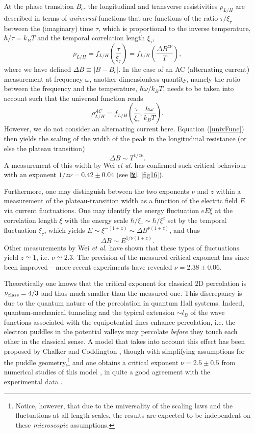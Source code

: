\documentclass[10pt]{book}
\newcommand{\beq}{\begin{equation}}
\newcommand{\eeq}{\end{equation}}
\begin{document}
At the phase transition $B_c$, the longitudinal and transverse resistivities $\rho_{L/H}$ are described in terms of
{\sl universal} functions that are functions of the ratio $\tau/\xi_{\tau}$ between the (imaginary) time $\tau$,
which is proportional to the inverse temperature, $\hbar/\tau = k_B T$ \cite{sondhiRev,sachdev} and the
temporal correlation length $\xi_{\tau}$,
\beq\label{univFunc}
\rho_{L/H} = f_{L/H} \left(\frac{\tau}{\xi_{\tau}}\right) = f_{L/H}\left(\frac{\Delta B^{z\nu}}{T}\right), 
\eeq
where we have defined $\Delta B \equiv |B-B_c|$. In the case of an AC (alternating current) measurement
at frequency $\omega$, another 
dimensionless quantity, namely the ratio between the frequency and the temperature,
$\hbar\omega/k_BT$, needs to be taken into account such that the universal function reads 
$$
\rho_{L/H}^{AC} = f_{L/H} \left(\frac{\tau}{\xi_{\tau}},\frac{\hbar \omega}{k_BT}\right).
$$
However, we do not consider an alternating current here. Equation (\ref{univFunc}) then yields the scaling of the width of the 
peak in the longitudinal resistance (or else the plateau transition)
\beq\label{scalePW}
\Delta B \sim T^{1/z\nu}.
\eeq
A measurement of this width by Wei {\sl et al.} \cite{wei} has confirmed such critical behaviour with an exponent
$1/z\nu = 0.42\pm 0.04$ (see 图. \ref{fig16}). 

Furthermore, one may distinguish between the two exponents $\nu$ and $z$ within a measurement of the plateau-transition 
width as a function of the electric field $E$ via current fluctuations. One may identify the energy fluctuation 
$eE\xi$ at the correlation length $\xi$ with the energy scale $\hbar/\xi_{\tau}\sim \hbar/\xi^z$
set by the temporal fluctuation $\xi_{\tau}$, which yields $E\sim \xi^{-(1+z)}\sim \Delta B^{\nu(1+z)}$, and thus
\beq\label{scalePWel}
\Delta B \sim E^{1/\nu(1+z)}.
\eeq
Other measurements by Wei {\sl et al.} \cite{wei2} have shown that these types of fluctuations yield $z\simeq 1$, i.e. 
$\nu\simeq 2.3$. The precision of the measured critical exponent has since been improved -- more recent experiments 
\cite {li1,li2} have revealed $\nu=2.38\pm 0.06$.

Theoretically one knows that 
the critical exponent for classical 2D percolation is $\nu_{\rm class}=4/3$ and thus much smaller than the measured
one. This discrepancy is due to the quantum nature of the percolation in quantum Hall systems. Indeed,
quantum-mechanical tunneling and the typical extension $\sim l_B$ of the wave functions associated with the equipotential
lines enhance percolation, i.e. the electron puddles in the potential valleys may percolate {\sl before} they touch each
other in the classical sense. A model that takes into account this effect has been proposed by Chalker and Coddington \cite{CC},
though with simplifying assumptions for the puddle geometry,\footnote{Notice, however, that due to the universality of the 
scaling laws and the fluctuations at all length scales, the results are expected to be independent on these {\sl microscopic}
assumptions.} 
and one obtains a critical exponent $\nu=2.5 \pm 0.5$ from numerical studies of this model \cite{CC,huckestein}, in 
quite a good agreement with the experimental data \cite{wei,wei2}. 
\end{document}
